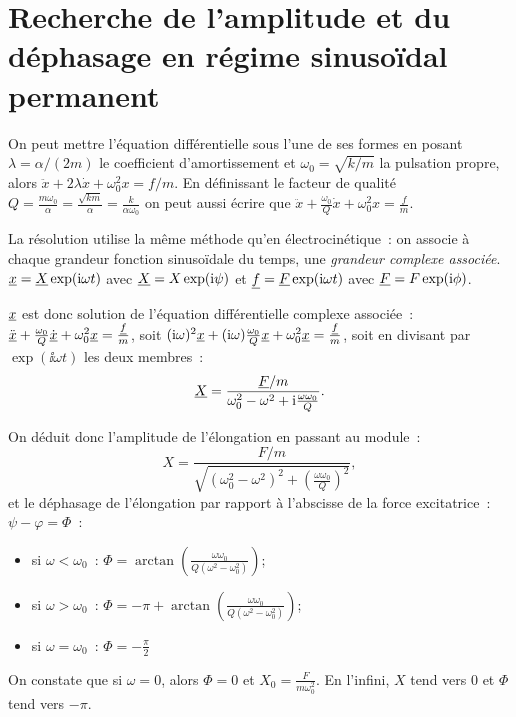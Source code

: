 \section{Recherche de l'amplitude et du déphasage en régime sinusoïdal
permanent}
On peut mettre l'équation différentielle sous l'une de ses formes en posant
\(\lambda = \alpha/(2m)\) le coefficient d'amortissement et
\(\omega_0=\sqrt{k/m}\) la pulsation propre, alors \(\ddot{x}+2\lambda
\dot{x}+\omega_0^2x = f/m\).%
En définissant le facteur de qualité \(Q =
\frac{m\omega_0}{\alpha}=\frac{\sqrt{km}}{\alpha}=\frac{k}{\alpha\omega_0}\) 
on%
peut aussi écrire que \(\ddot{x}+\frac{\omega_0}{Q}\dot{x}+\omega_0^2
x=\frac{f}{m}\).

La résolution utilise la même méthode qu'en électrocinétique~: on associe à
chaque grandeur fonction sinusoïdale du temps, une \emph{grandeur complexe
associée}.
\(\underline{x} = \underline{X}\exp(\mathrm{i}\omega t)\) avec \(\underline{X} = X\exp(\mathrm{i}\psi)\) et \(\underline{f} =
\underline{F}\exp(\mathrm{i}\omega t)\) avec \(\underline{F} = F\exp(\mathrm{i}\phi)\).

\(\underline{x}\) est donc solution de l'équation différentielle complexe associée~:
\(\ddot{\underline{x}}+\frac{\omega_0}{Q}\dot{\underline{x}}+\omega_0^2 \underline{x}=\frac{\underline{f}}{m}\), soit
\((\mathrm{i}\omega)^2\underline{x} + (\mathrm{i}\omega)\frac{\omega_0}{Q}\underline{x}+\omega_0^2\underline{x} =
\frac{\underline{f}}{m}\), soit en divisant par \(\exp(\ii\omega t)\) les deux membres~:%
\begin{equation}%
  \label{eq:elongationcomplexe}
  \Xc = \frac{\Fc/m}{\omega_0^2-\omega^2+\ii\frac{\omega\omega_0}{Q}}.
\end{equation}%

On déduit donc l'amplitude de l'élongation en passant au module~:
\begin{equation}%
  X =
  \frac{F/m}{\sqrt{(\omega_0^2-\omega^2)^2+\left(\frac{\omega\omega_0}{Q}\right)^2}},
\end{equation}%
et le déphasage de l'élongation par rapport à l'abscisse de la force
excitatrice~: \(\psi-\varphi = \Phi\)~: \begin{itemize}
  \item si \(\omega<\omega_0\)~: \(\Phi =
    \arctan(\frac{\omega\omega_0}{Q(\omega^2-\omega_0^2)})\);
  \item si \(\omega>\omega_0\)~: \(\Phi = -\pi +
    \arctan(\frac{\omega\omega_0}{Q(\omega^2-\omega_0^2)})\);
  \item si \(\omega=\omega_0\)~: \(\Phi = -\frac{\pi}{2}\)
\end{itemize}%
On constate que si \(\omega = 0\), alors \(\Phi=0\) et \(X_0 =
\frac{F}{m\omega_0^2}\). En l'infini, \(X\) tend vers 0 et \(\Phi\) tend vers%
\(-\pi\).

